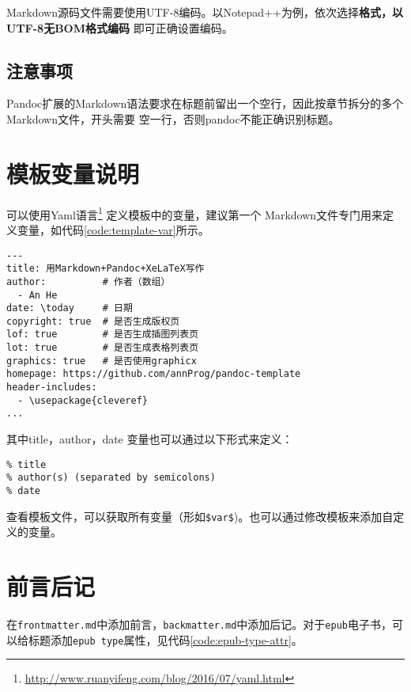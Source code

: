 \documentclass[fancyhdr,bookmark]{ctexbook}
\newcommand{\passthrough}[1]{#1}
\renewcommand{\href}[2]{#2\footnote{\url{#1}}}
\begin{document}
Markdown源码文件需要使用UTF-8编码。以Notepad++为例，依次选择\textbf{格式，以UTF-8无BOM格式编码}
即可正确设置编码。

\hypertarget{title:note}{%
\subsection{注意事项}\label{title:note}}

Pandoc扩展的Markdown语法要求在标题前留出一个空行，因此按章节拆分的多个Markdown文件，开头需要
空一行，否则pandoc不能正确识别标题。

\hypertarget{ux6a21ux677fux53d8ux91cfux8bf4ux660e}{%
\section{模板变量说明}\label{ux6a21ux677fux53d8ux91cfux8bf4ux660e}}

可以使用\href{http://www.ruanyifeng.com/blog/2016/07/yaml.html}{Yaml语言}
定义模板中的变量，建议第一个
Markdown文件专门用来定义变量，如代码\ref{code:template-var}所示。

\begin{lstlisting}[label=code:template-var, caption=code:template-var, float=htbp]
---
title: 用Markdown+Pandoc+XeLaTeX写作
author:          # 作者（数组）
  - An He
date: \today     # 日期
copyright: true  # 是否生成版权页
lof: true        # 是否生成插图列表页
lot: true        # 是否生成表格列表页
graphics: true   # 是否使用graphicx
homepage: https://github.com/annProg/pandoc-template
header-includes:
  - \usepackage{cleveref}
...
\end{lstlisting}

其中title，author，date 变量也可以通过以下形式来定义：

\begin{lstlisting}
% title
% author(s) (separated by semicolons)
% date
\end{lstlisting}

查看模板文件，可以获取所有变量（形如\passthrough{\lstinline!$var$!})。也可以通过修改模板来添加自定义的变量。

\hypertarget{ux524dux8a00ux540eux8bb0}{%
\section{前言后记}\label{ux524dux8a00ux540eux8bb0}}

在\passthrough{\lstinline!frontmatter.md!}中添加前言，\passthrough{\lstinline!backmatter.md!}中添加后记。对于\passthrough{\lstinline!epub!}电子书，可以给标题添加\passthrough{\lstinline!epub type!}属性，见代码\ref{code:epub-type-attr}。
\end{document}
